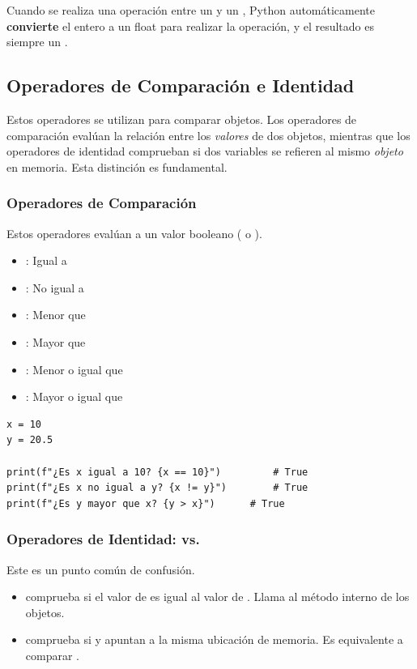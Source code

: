 Cuando se realiza una operación entre un  y un , Python automáticamente \textbf{convierte} el entero a un float para realizar la operación, y el resultado es siempre un .

\subsection{Operadores de Comparación e Identidad}
\label{subsec:comparison_identity}
Estos operadores se utilizan para comparar objetos. Los operadores de comparación evalúan la relación entre los \textit{valores} de dos objetos, mientras que los operadores de identidad comprueban si dos variables se refieren al mismo \textit{objeto} en memoria. Esta distinción es fundamental.

\subsubsection*{Operadores de Comparación}
Estos operadores evalúan a un valor booleano ( o ).
\begin{itemize}
    \item \code{==}: Igual a
    \item \code{!=}: No igual a
    \item \code{<}: Menor que
    \item \code{>}: Mayor que
    \item \code{<=}: Menor o igual que
    \item \code{>=}: Mayor o igual que
\end{itemize}
\text{ }\begin{verbatim}
x = 10
y = 20.5

print(f"¿Es x igual a 10? {x == 10}")         # True
print(f"¿Es x no igual a y? {x != y}")        # True
print(f"¿Es y mayor que x? {y > x}")      # True
\end{verbatim}

\subsubsection*{Operadores de Identidad:  vs. \code{==}}
Este es un punto común de confusión.
\begin{itemize}
    \item {} comprueba si el valor de  es igual al valor de . Llama al método interno  de los objetos.
    \item {} comprueba si  y  apuntan a la misma ubicación de memoria. Es equivalente a comparar .
\end{itemize}

